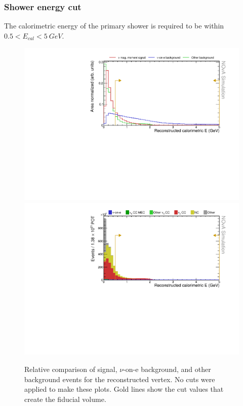 \subsubsection*{Shower energy cut}

The calorimetric energy of the primary shower is required to be within $0.5<E_{cal}<5\ \unit{GeV}$.

\begin{figure}[hbtp]
\centering
\includegraphics[width=.9\textwidth]{Plots/NuMMEventSelection/N1Cut_calE.pdf}
\includegraphics[width=.9\textwidth]{Plots/NuMMEventSelection/N1Cut_calE_BkgDecomp.pdf}
\caption{Relative comparison of signal, $\nu$-on-e background, and other background events for the reconstructed vertex. No cuts were applied to make these plots. Gold lines show the cut values that create the fiducial volume.}
\label{fig:SingleShowerCuts1}
\end{figure}

